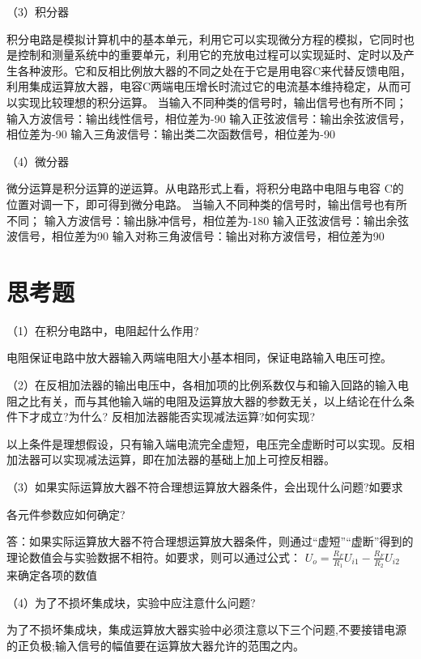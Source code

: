 \documentclass{article}
\begin{document}
\par
（3）积分器\par
积分电路是模拟计算机中的基本单元，利用它可以实现微分方程的模拟，它同时也是控制和测量系统中的重要单元，利用它的充放电过程可以实现延时、定时以及产生各种波形。它和反相比例放大器的不同之处在于它是用电容C来代替反馈电阻，利用集成运算放大器，电容C两端电压增长时流过它的电流基本维持稳定，从而可以实现比较理想的积分运算。
当输入不同种类的信号时，输出信号也有所不同；
输入方波信号：输出线性信号，相位差为-90
输入正弦波信号：输出余弦波信号，相位差为-90
输入三角波信号：输出类二次函数信号，相位差为-90
\par

（4）微分器\par
微分运算是积分运算的逆运算。从电路形式上看，将积分电路中电阻与电容 C的位置对调一下，即可得到微分电路。
当输入不同种类的信号时，输出信号也有所不同；
输入方波信号：输出脉冲信号，相位差为-180
输入正弦波信号：输出余弦波信号，相位差为90
输入对称三角波信号：输出对称方波信号，相位差为90
\par

\section{思考题}
（1）在积分电路中，电阻起什么作用?\par
电阻保证电路中放大器输入两端电阻大小基本相同，保证电路输入电压可控。
\par
（2）在反相加法器的输出电压中，各相加项的比例系数仅与和输入回路的输入电阻之比有关，而与其他输入端的电阻及运算放大器的参数无关，以上结论在什么条件下才成立?为什么? 反相加法器能否实现减法运算?如何实现?\par
以上条件是理想假设，只有输入端电流完全虚短，电压完全虚断时可以实现。反相加法器可以实现减法运算，即在加法器的基础上加上可控反相器。
\par
（3）如果实际运算放大器不符合理想运算放大器条件，会出现什么问题?如要求

各元件参数应如何确定?\par
答：如果实际运算放大器不符合理想运算放大器条件，则通过“虚短”“虚断”得到的理论数值会与实验数据不相符。如要求，则可以通过公式：
$U_o=\frac{R_F}{R_1}U_{i1}-\frac{R_F}{R_2}U_{i2}$
来确定各项的数值
\par
（4）为了不损坏集成块，实验中应注意什么问题?\par
为了不损坏集成块，集成运算放大器实验中必须注意以下三个问题,不要接错电源的正负极;输入信号的幅值要在运算放大器允许的范围之内。
\end{document}
